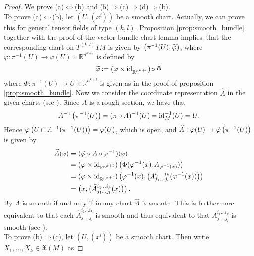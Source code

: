 \begin{proof}
We prove (a)$\Leftrightarrow$(b) and (b)$\Rightarrow$(c)$\Rightarrow$(d)$\Rightarrow$(b).\\
To prove (a)$\Leftrightarrow$(b), let $(U,(x^i))$ be a smooth chart. Actually, we can prove this for general tensor fields of type $(k,l)$. Proposition \ref{prop:smooth_bundle} together with the proof of the vector bundle chart lemma \cite[253--254]{lee:smooth_manifolds:2013} implies, that the corresponding chart on $T^{(k,l)}TM$ is given by $\del[1]{\pi^{-1}(U),\widetilde{\varphi}}$, where $\widetilde{\varphi}: \pi^{-1}(U) \to \varphi(U) \times \mathbb{R}^{n^{k+l}}$ is defined by
\begin{equation*}
\widetilde{\varphi} := (\varphi \times \operatorname{id}_{\mathbb{R}^{n^{k+l}}}) \circ \Phi
\end{equation*}
\noindent where $\Phi : \pi^{-1}(U) \to U \times \mathbb{R}^{n^{k + l}}$ is given as in the proof of proposition \ref{prop:smooth_bundle}. Now we consider the coordinate representation $\widehat{A}$ in the given charts (see \cite[35]{lee:smooth_manifolds:2013}). Since $A$ is a rough section, we have that 
\begin{equation*}
A^{-1}\del[1]{\pi^{-1}(U)} = (\pi \circ A)^{-1}(U) = \id_M^{-1}(U) = U.
\end{equation*}
Hence $\varphi\del[1]{U \cap A^{-1}(\pi^{-1}(U))} = \varphi(U)$, which is open, and $\widehat{A}: \varphi(U) \to \widetilde{\varphi}\del[1]{\pi^{-1}(U)}$ is given by
\begin{align*}
\widehat{A}(x) &= (\widetilde{\varphi} \circ A \circ \varphi^{-1})(x)\\
&= (\varphi \times \id_{\mathbb{R}^{n^{k+l}}})\del[1]{\Phi(\varphi^{-1}(x),A_{\varphi^{-1}(x)})}\\
&= (\varphi \times \id_{\mathbb{R}^{n^{k+l}}})\del[1]{\varphi^{-1}(x),\del[1]{A^{i_1\dots i_k}_{j_1\dots j_l}(\varphi^{-1}(x))}}\\
&= \del[1]{x,\del[1]{\widehat{A}^{i_1\dots i_k}_{j_1\dots j_l}(x)}}.
\end{align*}
By \cite[35]{lee:smooth_manifolds:2013} $A$ is smooth if and only if in any chart $\widehat{A}$ is smooth. This is furthermore equivalent to that each $\widehat{A}^{i_1\dots i_k}_{j_1\dots j_l}$ is smooth and thus equivalent to that $A^{i_1\dots i_k}_{j_1\dots j_l}$ is smooth (see \cite[33]{lee:smooth_manifolds:2013}).\\
To prove (b)$\Rightarrow$(c), let $(U,(x^i))$ be a smooth chart. Then write $X_1,\dots,X_k \in \mathfrak{X}(M)$ as 

\end{proof}
